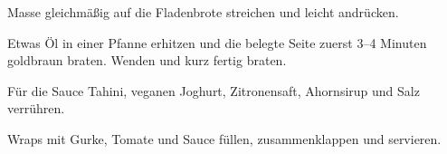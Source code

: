 \begin{recipe}
{    \step%
    Masse gleichmäßig auf die Fladenbrote streichen und leicht andrücken.
    
    \step%
    Etwas Öl in einer Pfanne erhitzen und die belegte Seite zuerst 3--4 Minuten goldbraun braten. Wenden und kurz fertig braten.
    
    \step%
    Für die Sauce Tahini, veganen Joghurt, Zitronensaft, Ahornsirup und Salz verrühren.
    
    \step%
    Wraps mit Gurke, Tomate und Sauce füllen, zusammenklappen und servieren.
}


\end{recipe}